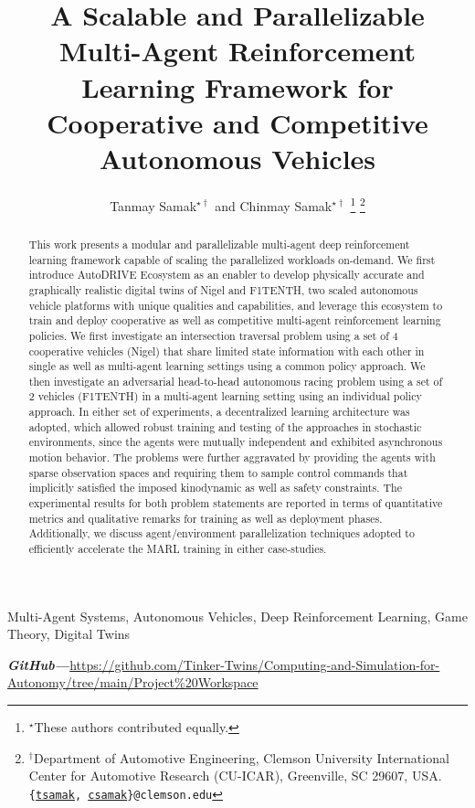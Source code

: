 \documentclass[letterpaper, 10 pt, conference]{ieeeconf}  %
\title{\LARGE \bf
A Scalable and Parallelizable Multi-Agent Reinforcement Learning Framework for Cooperative and Competitive Autonomous Vehicles
}
\author{Tanmay Samak$^{\star \dagger}$ and Chinmay Samak$^{\star \dagger}$%
\thanks{$^{\star}$These authors contributed equally.}%
\thanks{$^{\dagger}$Department of Automotive Engineering, Clemson University International Center for Automotive Research (CU-ICAR), Greenville, SC 29607, USA.
{\tt\small {\{\href{mailto:tsamak@clemson.edu}{tsamak}, \href{mailto:csamak@clemson.edu}{csamak}\}@clemson.edu}}}%
}
\begin{document}
\maketitle
\thispagestyle{empty}
\pagestyle{empty}


\begin{abstract}
This work presents a modular and parallelizable multi-agent deep reinforcement learning framework capable of scaling the parallelized workloads on-demand. We first introduce AutoDRIVE Ecosystem as an enabler to develop physically accurate and graphically realistic digital twins of Nigel and F1TENTH, two scaled autonomous vehicle platforms with unique qualities and capabilities, and leverage this ecosystem to train and deploy cooperative as well as competitive multi-agent reinforcement learning policies. We first investigate an intersection traversal problem using a set of 4 cooperative vehicles (Nigel) that share limited state information with each other in single as well as multi-agent learning settings using a common policy approach. We then investigate an adversarial head-to-head autonomous racing problem using a set of 2 vehicles (F1TENTH) in a multi-agent learning setting using an individual policy approach. In either set of experiments, a decentralized learning architecture was adopted, which allowed robust training and testing of the approaches in stochastic environments, since the agents were mutually independent and exhibited asynchronous motion behavior. The problems were further aggravated by providing the agents with sparse observation spaces and requiring them to sample control commands that implicitly satisfied the imposed kinodynamic as well as safety constraints. The experimental results for both problem statements are reported in terms of quantitative metrics and qualitative remarks for training as well as deployment phases. Additionally, we discuss agent/environment parallelization techniques adopted to efficiently accelerate the MARL training in either case-studies.\\%
\end{abstract}

\begin{keywords}
Multi-Agent Systems, Autonomous Vehicles, Deep Reinforcement Learning, Game Theory, Digital Twins\\%
\end{keywords}

\textbf{\textit{\small GitHub---}}{\small \url{https://github.com/Tinker-Twins/Computing-and-Simulation-for-Autonomy/tree/main/Project\%20Workspace}}\\%
\end{document}
